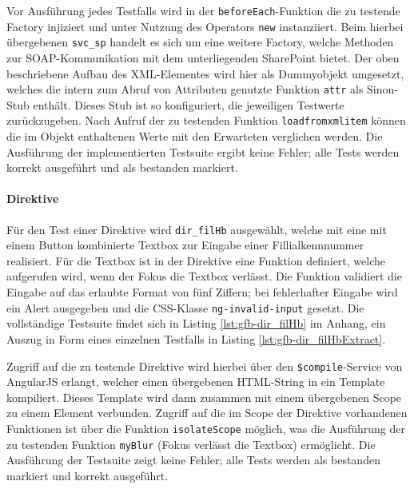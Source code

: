 \begin{figure}[H]
	
\end{figure}

Vor Ausführung jedes Testfalls wird in der \texttt{beforeEach}-Funktion die zu testende Factory injiziert und unter Nutzung des Operators \texttt{new} instanziiert. Beim hierbei übergebenen \texttt{svc\_sp} handelt es sich um eine weitere Factory, welche Methoden zur SOAP-Kommunikation mit dem unterliegenden SharePoint bietet. Der oben beschriebene Aufbau des XML-Elementes wird hier als Dummyobjekt umgesetzt, welches die intern zum Abruf von Attributen genutzte Funktion \texttt{attr} als Sinon-Stub enthält. Dieses Stub ist so konfiguriert, die jeweiligen Testwerte zurückzugeben. Nach Aufruf der zu testenden Funktion \texttt{loadfromxmlitem} können die im Objekt enthaltenen Werte mit den Erwarteten verglichen werden. Die Ausführung der implementierten Testsuite ergibt keine Fehler; alle Tests werden korrekt ausgeführt und als bestanden markiert.

\paragraph{Direktive}
Für den Test einer Direktive wird \texttt{dir\_filHb} ausgewählt, welche mit eine mit einem Button kombinierte Textbox zur Eingabe einer Fillialkennnummer \todo{} realisiert. Für die Textbox ist in der Direktive eine Funktion definiert, welche aufgerufen wird, wenn der Fokus die Textbox verlässt. Die Funktion validiert die Eingabe auf das erlaubte Format von fünf Ziffern; bei fehlerhafter Eingabe wird ein Alert ausgegeben und die CSS-Klasse \texttt{ng-invalid-input} gesetzt. Die vollständige Testsuite findet sich in Listing \ref{lst:gfb-dir_filHb} im Anhang, ein Auszug in Form eines einzelnen Testfalls in Listing \ref{lst:gfb-dir_filHbExtract}.

\begin{figure}[H]
	
\end{figure}

Zugriff auf die zu testende Direktive wird hierbei über den \texttt{\$compile}-Service von AngularJS erlangt, welcher einen übergebenen HTML-String in ein Template kompiliert\cite{angular-compile}. Dieses Template wird dann zusammen mit einem übergebenen Scope zu einem Element verbunden. Zugriff auf die im Scope der Direktive vorhandenen Funktionen ist über die Funktion \texttt{isolateScope} möglich, was die Ausführung der zu testenden Funktion \texttt{myBlur} (Fokus verlässt die Textbox) ermöglicht. Die Ausführung der Testsuite zeigt keine Fehler; alle Tests werden als bestanden markiert und korrekt ausgeführt.

